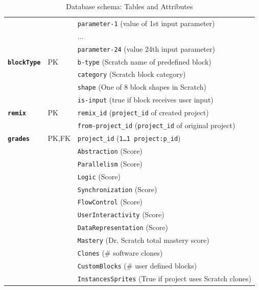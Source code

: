 \documentclass[10pt, conference]{IEEEtran}
\begin{document}
\begin{table}[]
\begin{tabular}{llp{5.4cm}}
		&  & \texttt{parameter-1} (value of 1st input parameter)\\
		&  & ... \\
		&  & \texttt{parameter-24} (value 24th input parameter)\\
		\hline
		\textbf{\texttt{blockType}} & PK & \texttt{b-type} (Scratch name of predefined block)\\
		&  & \texttt{category} (Scratch block category)\\
		&  & \texttt{shape} (One of 8 block shapes in Scratch)\\
		&  & \texttt{is-input} (true if block receives user input)\\
		\hline
		\textbf{\texttt{remix}} & PK  & \texttt{remix\_id} (\texttt{\scriptsize{project\_id}} of created project)\\
		&  & \texttt{from-project\_id} (\texttt{\scriptsize{project\_id}} of original project)\\
		\hline
		\textbf{\texttt{grades}} & PK,FK & \texttt{project\_id} (\texttt{\scriptsize{1\ldots1 project:p\_id}})\\

		& & \texttt{Abstraction} (Score)\\
		& & \texttt{Parallelism} (Score)\\
		& & \texttt{Logic} (Score)\\
		& & \texttt{Synchronization} (Score)\\
		& & \texttt{FlowControl} (Score)\\
		& & \texttt{UserInteractivity} (Score)\\
		& & \texttt{DataRepresentation} (Score)\\
		& & \texttt{Mastery} (Dr. Scratch total mastery score)\\
		& & \texttt{Clones} (\# software clones)\\
		& & \texttt{CustomBlocks} (\# user defined blocks)\\
		& & \texttt{InstancesSprites} (True if project uses Scratch clones)\\
		\hline
	\end{tabular}
	\caption{Database schema: Tables and Attributes}
	\label{tbl-dbschema}
\end{table}
\end{document}
